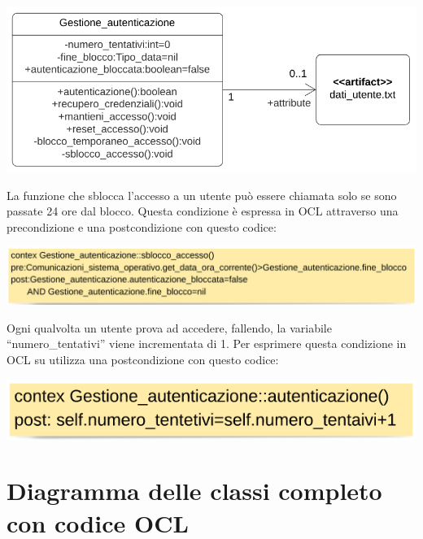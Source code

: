 \documentclass{article}
\begin{document}
    \begin{center}
            \includegraphics[scale=0.5]{classi/Gestione_autenticazione.png}
    \end{center}
    \hfill \break
    
    La funzione che sblocca l’accesso a un utente può essere chiamata solo se sono passate 24 ore dal blocco. Questa condizione è espressa in OCL attraverso una precondizione e una postcondizione con questo codice:\\

     \begin{center}
            \includegraphics[scale=0.5]{OCL/Gestione autenticazione 2.png}
    \end{center}
    \hfill \break
    
    Ogni qualvolta un utente prova ad accedere, fallendo, la variabile “numero\_tentativi” viene incrementata di 1. Per esprimere questa condizione in OCL su utilizza una postcondizione con questo codice:\\

     \begin{center}
            \includegraphics[scale=0.5]{OCL/Gestione autenticazione 3.png}
    \end{center}
    \hfill \break
    
    
    
    
    
    
    
    
    \section{Diagramma delle classi completo con codice OCL}
    
\end{document}
